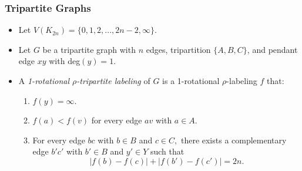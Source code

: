\documentclass[11pt,serif,professionalfont,aspectratio=169]{beamer}
\theoremstyle{plain}
\begin{document}
\begin{frame}
\frametitle{Tripartite Graphs}
\begin{itemize}
\item Let $V(K_{2n})=\{0,1,2,...,2n-2,\infty\}.$\\
\pause
\item Let $G$ be a tripartite graph with $n$ edges, tripartition $\{A,B,C\}$, and pendant edge $xy$ with deg$(y)=1$.
\pause
\item
A \emph{1-rotational $\rho$-tripartite labeling} of $G$ is a 1-rotational $\rho$-labeling $f$ that:
\begin{enumerate}
    \item $f(y)=\infty.$
    \item $f(a)<f(v)$ for every edge $av$ with $a \in A.$
    \item For every edge $bc$ with $b \in B$ and $c \in C,$ there exists a complementary edge $b'c'$ with $b' \in B$ and $y' \in Y$ such that 
\[ |f(b)-f(c)|+|f(b')-f(c')|=2n.
\]
\end{enumerate}
\end{itemize}
\end{frame}
\end{document}
